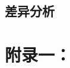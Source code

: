 \documentclass[10pt,a4paper,twoside]{article}
\numberwithin{figure}{section}%
\numberwithin{table}{section}%
\begin{document}
\subsection{差异分析}













\newpage
\appendix%
\section*{附录一：}
\end{document}
